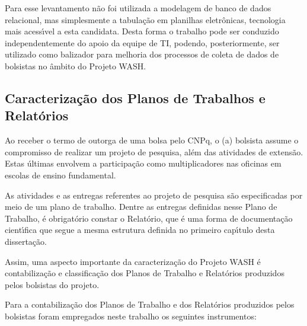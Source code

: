 \documentclass[
12pt,		%
openright,	%
twoside,  %
a4paper,			%
chapter=TITLE,		%
english,			%
french,				%
spanish,			%
brazil				%
]{USPSC-classe/USPSC}
\begin{document}
Para esse levantamento n\~ao foi utilizada a modelagem de banco de dados relacional, mas simplesmente a tabula\c{c}\~ao em planilhas eletr\^onicas, tecnologia mais acess\'{\i}vel a esta candidata. Desta forma o trabalho pode ser conduzido independentemente do apoio da equipe de TI, podendo, posteriormente, ser utilizado como balizador para melhoria dos processos de coleta de dados de bolsistas no \^ambito do Projeto WASH.










\subsection[Caracteriza\c{c}\~ao dos Planos de Trabalhos e Relat\'orios]{Caracteriza\c{c}\~ao dos Planos de Trabalhos e Relat\'orios}\label{Caracteriza\c{c}\~ao dos Planos de Trabalhos e Relat\'orios}
Ao receber o termo de outorga de uma bolsa pelo CNPq, o (a) bolsista assume o compromisso de realizar um projeto de pesquisa, al\'em das atividades de extens\~ao. Estas \'ultimas envolvem a participa\c{c}\~ao como multiplicadores nas oficinas em escolas de ensino fundamental.










As atividades e as entregas referentes ao projeto de pesquisa s\~ao especificadas por meio de um plano de trabalho. Dentre as entregas definidas nesse Plano de Trabalho, \'e obrigat\'orio constar o Relat\'orio, que \'e uma forma de documenta\c{c}\~ao cient\'{\i}fica que segue a mesma estrutura definida no primeiro cap\'{\i}tulo desta disserta\c{c}\~ao.











Assim, uma aspecto importante da caracteriza\c{c}\~ao do Projeto WASH \'e contabiliza\c{c}\~ao e classifica\c{c}\~ao dos Planos de Trabalho e Relat\'orios produzidos pelos bolsistas do projeto.










Para a contabiliza\c{c}\~ao dos Planos de Trabalho e dos Relat\'orios produzidos pelos bolsistas foram empregados neste trabalho os seguintes instrumentos:
\end{document}
